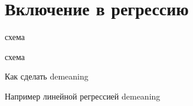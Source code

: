 \section{Включение в регрессию}

\begin{frame}{схема}
    
\end{frame}

\begin{frame}{схема}
    
\end{frame}

\begin{frame}{Как сделать}
    demeaning    
\end{frame}

\begin{frame}{Например линейной регрессией}
    demeaning    
\end{frame}



